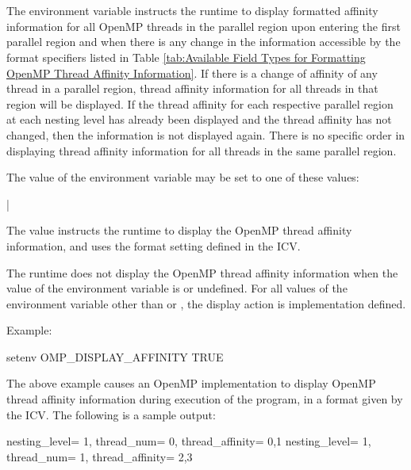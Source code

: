 \section{}
\label{sec:OMP_DISPLAY_AFFINITY}
The  environment variable instructs the runtime to
display formatted affinity information for all OpenMP threads in the parallel
region upon entering the first parallel region and when there is any change in
the information accessible by the format specifiers listed in Table
\ref{tab:Available Field Types for Formatting OpenMP Thread Affinity Information}.
If there is a change of affinity of any thread in a parallel region, thread
affinity information for all threads in that region will be displayed.
If the thread affinity for each respective parallel region at each nesting level
has already been displayed and the thread affinity has not changed, then the
information is not displayed again.
There is no specific order in displaying thread affinity information for all
threads in the same parallel region.

The value of the  environment variable may be set 
to one of these values:

{|}

The  value instructs the runtime to display the OpenMP thread 
affinity information, and uses the format setting defined in the 
 ICV.

The runtime does not display the OpenMP thread affinity information when the 
value of the  environment variable is  
or undefined. For all values of the environment variable other than  
or , the display action is implementation defined.

Example:
\begin{ompEnv}
setenv OMP_DISPLAY_AFFINITY TRUE
\end{ompEnv}

The above example causes an OpenMP implementation to display OpenMP thread 
affinity information during execution of the program, in a format given by 
the  ICV.  The following is a sample output:

\begin{ompSyntax}
nesting_level=   1,   thread_num=   0,   thread_affinity=    0,1
nesting_level=   1,   thread_num=   1,   thread_affinity=    2,3
\end{ompSyntax}

